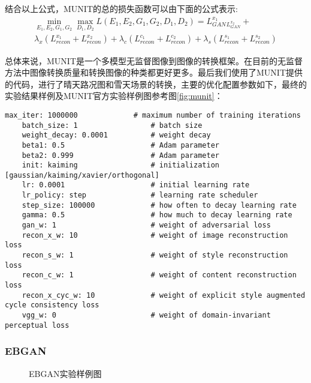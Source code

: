 结合以上公式，MUNIT的总的损失函数可以由下面的公式表示:
\begin{equation}
\begin{aligned}
    \min_{E_1,E_2,G_1,G_2}\max_{D_1,D_2}L(E_1,E_2,G_1,G_2,D_1,D_2)=L_{GAN}^{x_1}_L_{GAN}^{x_2}+\\
\lambda_x(L_{recon}^{x_1}+L_{recon}^{x_2})+\lambda_c(L_{recon}^{c_1}+L_{recon}^{c_2})+\lambda_s(L_{recon}^{s_1}+L_{recon}^{s_2})
\end{aligned}
\end{equation}

总体来说，MUNIT是一个多模型无监督图像到图像的转换框架。在目前的无监督方法中图像转换质量和转换图像的种类都更好更多。最后我们使用了MUNIT提供的代码，进行了晴天路况图和雪天场景的转换，主要的优化配置参数如下，最终的实验结果样例及MUNIT官方实验样例图参考图\ref{fig:munit}：

\begin{lstlisting}[basicstyle=\small, caption={MUNIT主要优化参数配置}, captionpos=b]
    max_iter: 1000000             # maximum number of training iterations
    batch_size: 1                 # batch size
    weight_decay: 0.0001          # weight decay
    beta1: 0.5                    # Adam parameter
    beta2: 0.999                  # Adam parameter
    init: kaiming                 # initialization [gaussian/kaiming/xavier/orthogonal]
    lr: 0.0001                    # initial learning rate
    lr_policy: step               # learning rate scheduler
    step_size: 100000             # how often to decay learning rate
    gamma: 0.5                    # how much to decay learning rate
    gan_w: 1                      # weight of adversarial loss
    recon_x_w: 10                 # weight of image reconstruction loss
    recon_s_w: 1                  # weight of style reconstruction loss
    recon_c_w: 1                  # weight of content reconstruction loss
    recon_x_cyc_w: 10             # weight of explicit style augmented cycle consistency loss
    vgg_w: 0                      # weight of domain-invariant perceptual loss
\end{lstlisting}

\subsubsection[EBGAN]{EBGAN}

\begin{figure}[b]
    \centering
    \caption{EBGAN实验样例图}
    \label{fig:ebgan}
\end{figure}

